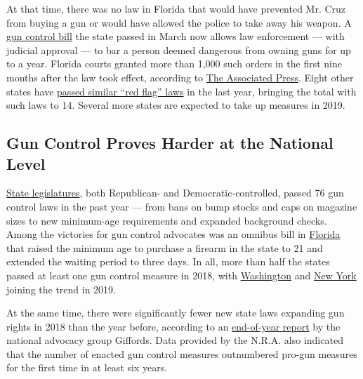 At that time, there was no law in Florida that would have prevented Mr.
Cruz from buying a gun or would have allowed the police to take away his
weapon. A
\href{https://www.nytimes.com/2018/03/08/us/florida-gun-bill.html}{gun
control bill} the state passed in March now allows law enforcement ---
with judicial approval --- to bar a person deemed dangerous from owning
guns for up to a year. Florida courts granted more than 1,000 such
orders in the first nine months after the law took effect, according to
\href{http://www.newser.com/article/206dca91a0e845269f3b3838df1b6c40/gun-seizure-laws-grow-in-popularity-since-parkland-shooting.html}{The
Associated Press}. Eight other states have
\href{https://www.nytimes.com/interactive/2018/12/14/us/politics/gun-control-laws.html}{passed
similar ``red flag'' laws} in the last year, bringing the total with
such laws to 14. Several more states are expected to take up measures in
2019.

\hypertarget{gun-control-proves-harder-at-the-national-level}{%
\subsection{Gun Control Proves Harder at the National
Level}\label{gun-control-proves-harder-at-the-national-level}}

\href{https://www.nytimes.com/interactive/2018/12/14/us/politics/gun-control-laws.html}{State
legislatures}, both Republican- and Democratic-controlled, passed 76 gun
control laws in the past year --- from bans on bump stocks and caps on
magazine sizes to new minimum-age requirements and expanded background
checks. Among the victories for gun control advocates was an omnibus
bill in
\href{https://www.nytimes.com/2018/03/07/us/florida-shooting-gunman-indicted.html}{Florida}
that raised the minimum age to purchase a firearm in the state to 21 and
extended the waiting period to three days. In all, more than half the
states passed at least one gun control measure in 2018, with
\href{https://www.nytimes.com/2019/01/02/us/washington-state-new-gun-law.html}{Washington}
and
\href{https://www.nytimes.com/2019/01/29/nyregion/gun-laws-new-york.html}{New
York} joining the trend in 2019.

At the same time, there were significantly fewer new state laws
expanding gun rights in 2018 than the year before, according to an
\href{https://lawcenter.giffords.org/wp-content/uploads/2018/12/Giffords-Law-Center-Year-End-Trendwatch-2018_Digital-Spreads.pdf}{end-of-year
report} by the national advocacy group Giffords. Data provided by the
N.R.A. also indicated that the number of enacted gun control measures
outnumbered pro-gun measures for the first time in at least six years.

